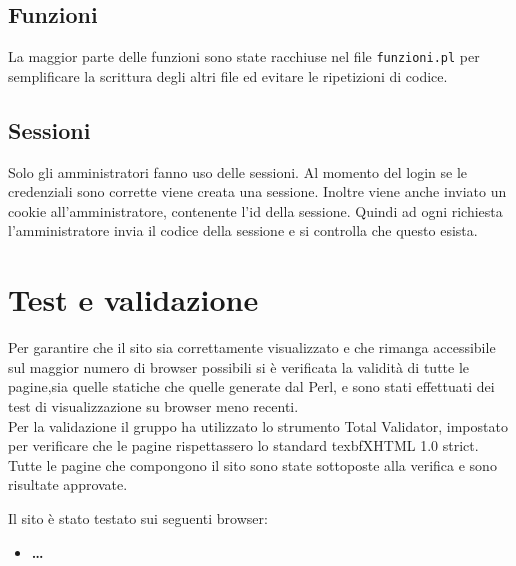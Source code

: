 \documentclass{article}
\begin{document}
	\subsection{Funzioni}
		La maggior parte delle funzioni sono state racchiuse nel file \texttt{funzioni.pl} per semplificare la scrittura degli 
		altri file ed evitare le ripetizioni di codice.
	\subsection{Sessioni}
		Solo gli amministratori fanno uso delle sessioni. Al momento del login se le credenziali sono corrette viene creata una
		sessione. Inoltre viene anche inviato un cookie all'amministratore, contenente l'id della sessione. Quindi ad ogni
		richiesta l'amministratore invia il codice della sessione e si controlla che questo esista.


\section{Test e validazione}

	Per garantire che il sito sia correttamente visualizzato e che rimanga accessibile sul maggior numero di browser possibili 
	si è verificata la validità di tutte le pagine,sia quelle statiche che quelle generate dal Perl, e sono stati effettuati 
	dei test di visualizzazione su browser meno recenti. \\
	Per la validazione il gruppo ha utilizzato lo strumento Total Validator, impostato per verificare che le pagine rispettassero
	lo standard texbf{XHTML 1.0 strict}. Tutte le pagine che compongono il sito sono state sottoposte alla verifica e sono 
	risultate approvate.
	
	Il sito è stato testato sui seguenti browser:
	\begin{itemize}
		\item \textbf{\dots}
	\end{itemize}
	


 \newpage

\end{document}
